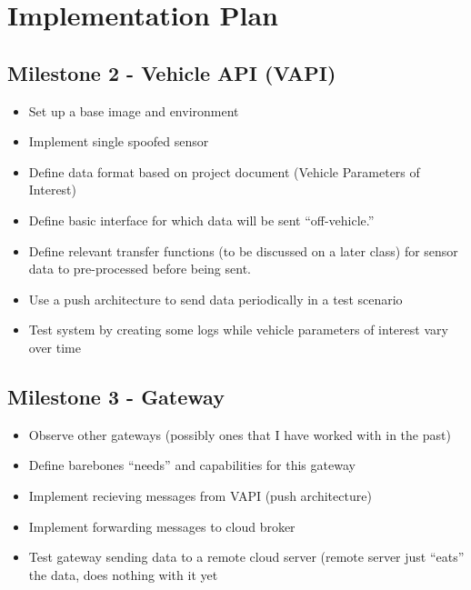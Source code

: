 \section{Implementation Plan}
\subsection{Milestone 2 - Vehicle API (VAPI)}
\begin{itemize}
\setlength\itemsep{-0.5em}
    \item Set up a base image and environment
    \item Implement single spoofed sensor
    \item Define data format based on project document (Vehicle Parameters of Interest)
    \item Define basic interface for which data will be sent ``off-vehicle.''
    \item Define relevant transfer functions (to be discussed on a later class) for sensor data to pre-processed before being sent.
    \item Use a push architecture to send data periodically in a test scenario
    \item Test system by creating some logs while vehicle parameters of interest vary over time
\end{itemize}

\subsection{Milestone 3 - Gateway}
\begin{itemize}
\setlength\itemsep{-0.5em}
    \item Observe other gateways (possibly ones that I have worked with in the past)
    \item Define barebones ``needs'' and capabilities for this gateway
    \item Implement recieving messages from VAPI (push architecture)
    \item Implement forwarding messages to cloud broker
    \item Test gateway sending data to a remote cloud server (remote server just ``eats'' the data, does nothing with it yet
\end{itemize}

